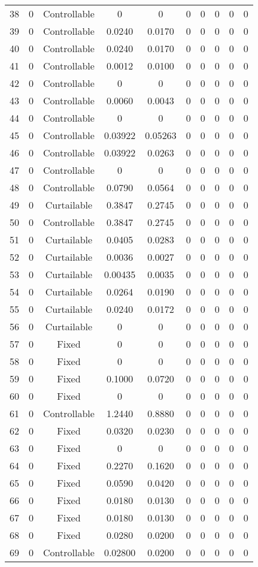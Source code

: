 \begin{longtable}{cccccccccc}
	38 & 0 & Controllable & 0 & 0 & 0 & 0 & 0 & 0 & 0 \\
	39 & 0 & Controllable & 0.0240 & 0.0170 & 0 & 0 & 0 & 0 & 0 \\
	40 & 0 & Controllable & 0.0240 & 0.0170 & 0 & 0 & 0 & 0 & 0 \\
	41 & 0 & Controllable & 0.0012 & 0.0100 & 0 & 0 & 0 & 0 & 0 \\
	42 & 0 & Controllable & 0 & 0 & 0 & 0 & 0 & 0 & 0 \\
	43 & 0 & Controllable & 0.0060 & 0.0043 & 0 & 0 & 0 & 0 & 0 \\
	44 & 0 & Controllable & 0 & 0 & 0 & 0 & 0 & 0 & 0 \\
	45 & 0 & Controllable & 0.03922 & 0.05263 & 0 & 0 & 0 & 0 & 0 \\
	46 & 0 & Controllable & 0.03922 & 0.0263 & 0 & 0 & 0 & 0 & 0 \\
	47 & 0 & Controllable & 0 & 0 & 0 & 0 & 0 & 0 & 0 \\
	48 & 0 & Controllable & 0.0790 & 0.0564 & 0 & 0 & 0 & 0 & 0 \\
	49 & 0 & Curtailable & 0.3847 & 0.2745 & 0 & 0 & 0 & 0 & 0 \\
	50 & 0 & Controllable & 0.3847 & 0.2745 & 0 & 0 & 0 & 0 & 0 \\
	51 & 0 & Curtailable & 0.0405 & 0.0283 & 0 & 0 & 0 & 0 & 0 \\
	52 & 0 & Curtailable & 0.0036 & 0.0027 & 0 & 0 & 0 & 0 & 0 \\
	53 & 0 & Curtailable & 0.00435 & 0.0035 & 0 & 0 & 0 & 0 & 0 \\
	54 & 0 & Curtailable & 0.0264 & 0.0190 & 0 & 0 & 0 & 0 & 0 \\
	55 & 0 & Curtailable & 0.0240 & 0.0172 & 0 & 0 & 0 & 0 & 0 \\
	56 & 0 & Curtailable & 0 & 0 & 0 & 0 & 0 & 0 & 0 \\
	57 & 0 & Fixed & 0 & 0 & 0 & 0 & 0 & 0 & 0 \\
	58 & 0 & Fixed & 0 & 0 & 0 & 0 & 0 & 0 & 0 \\
	59 & 0 & Fixed & 0.1000 & 0.0720 & 0 & 0 & 0 & 0 & 0 \\
	60 & 0 & Fixed & 0 & 0 & 0 & 0 & 0 & 0 & 0 \\
	61 & 0 & Controllable & 1.2440 & 0.8880 & 0 & 0 & 0 & 0 & 0 \\
	62 & 0 & Fixed & 0.0320 & 0.0230 & 0 & 0 & 0 & 0 & 0 \\
	63 & 0 & Fixed & 0 & 0 & 0 & 0 & 0 & 0 & 0 \\
	64 & 0 & Fixed & 0.2270 & 0.1620 & 0 & 0 & 0 & 0 & 0 \\
	65 & 0 & Fixed & 0.0590 & 0.0420 & 0 & 0 & 0 & 0 & 0 \\
	66 & 0 & Fixed & 0.0180 & 0.0130 & 0 & 0 & 0 & 0 & 0 \\
	67 & 0 & Fixed & 0.0180 & 0.0130 & 0 & 0 & 0 & 0 & 0 \\
	68 & 0 & Fixed & 0.0280 & 0.0200 & 0 & 0 & 0 & 0 & 0 \\
	69 & 0 & Controllable & 0.02800 & 0.0200 & 0 & 0 & 0 & 0 & 0 \\
	\bottomrule %
\end{longtable}
